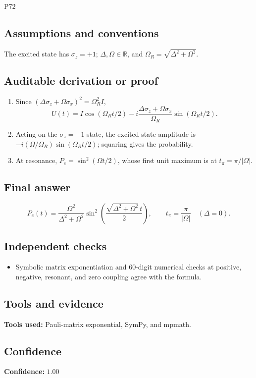 \documentclass[11pt]{article}
\newcommand{\R}{\mathbb{R}}
\begin{document}
\begin{mprsolution}{P72}
\subsection*{Assumptions and conventions}
The excited state has \(\sigma_z=+1\); \(\Delta,\Omega\in\R\), and
\(\Omega_R=\sqrt{\Delta^2+\Omega^2}\).
\subsection*{Auditable derivation or proof}
\begin{enumerate}[label=\textbf{Step \arabic*:},leftmargin=*]
\item Since \((\Delta\sigma_z+\Omega\sigma_x)^2=\Omega_R^2I\),
\[
U(t)=I\cos(\Omega_Rt/2)
-i\frac{\Delta\sigma_z+\Omega\sigma_x}{\Omega_R}
\sin(\Omega_Rt/2).
\]
\item Acting on the \(\sigma_z=-1\) state, the excited-state amplitude is
\(-i(\Omega/\Omega_R)\sin(\Omega_Rt/2)\); squaring gives the probability.
\item At resonance, \(P_e=\sin^2(\Omega t/2)\), whose first unit maximum is
at \(t_\pi=\pi/|\Omega|\).
\end{enumerate}
\subsection*{Final answer}
\[
\boxed{\displaystyle
P_e(t)=\frac{\Omega^2}{\Delta^2+\Omega^2}
\sin^2\!\left(\frac{\sqrt{\Delta^2+\Omega^2}\,t}{2}\right),
\qquad t_\pi=\frac{\pi}{|\Omega|}\quad(\Delta=0).}
\]
\subsection*{Independent checks}
\begin{itemize}[leftmargin=*]
\item Symbolic matrix exponentiation and 60-digit numerical checks at positive,
negative, resonant, and zero coupling agree with the formula.
\end{itemize}
\subsection*{Tools and evidence}
\textbf{Tools used:} Pauli-matrix exponential, SymPy, and mpmath.
\subsection*{Confidence}
\textbf{Confidence:} \(1.00\)
\end{mprsolution}
\end{document}
